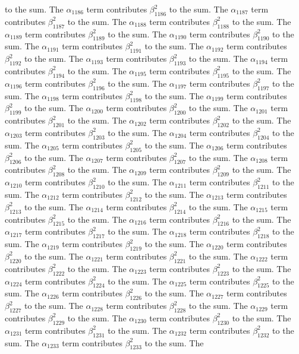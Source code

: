 \begin{lemma}
to the sum. The $\alpha_{1186}$ term contributes $\beta_{1186}^{2}$ to the sum. The $\alpha_{1187}$ term contributes $\beta_{1187}^{2}$ to the sum. The $\alpha_{1188}$ term contributes $\beta_{1188}^{2}$ to the sum. The $\alpha_{1189}$ term contributes $\beta_{1189}^{2}$ to the sum. The $\alpha_{1190}$ term contributes $\beta_{1190}^{2}$ to the sum. The $\alpha_{1191}$ term contributes $\beta_{1191}^{2}$ to the sum. The $\alpha_{1192}$ term contributes $\beta_{1192}^{2}$ to the sum. The $\alpha_{1193}$ term contributes $\beta_{1193}^{2}$ to the sum. The $\alpha_{1194}$ term contributes $\beta_{1194}^{2}$ to the sum. The $\alpha_{1195}$ term contributes $\beta_{1195}^{2}$ to the sum. The $\alpha_{1196}$ term contributes $\beta_{1196}^{2}$ to the sum. The $\alpha_{1197}$ term contributes $\beta_{1197}^{2}$ to the sum. The $\alpha_{1198}$ term contributes $\beta_{1198}^{2}$ to the sum. The $\alpha_{1199}$ term contributes $\beta_{1199}^{2}$ to the sum. The $\alpha_{1200}$ term contributes $\beta_{1200}^{2}$ to the sum. The $\alpha_{1201}$ term contributes $\beta_{1201}^{2}$ to the sum. The $\alpha_{1202}$ term contributes $\beta_{1202}^{2}$ to the sum. The $\alpha_{1203}$ term contributes $\beta_{1203}^{2}$ to the sum. The $\alpha_{1204}$ term contributes $\beta_{1204}^{2}$ to the sum. The $\alpha_{1205}$ term contributes $\beta_{1205}^{2}$ to the sum. The $\alpha_{1206}$ term contributes $\beta_{1206}^{2}$ to the sum. The $\alpha_{1207}$ term contributes $\beta_{1207}^{2}$ to the sum. The $\alpha_{1208}$ term contributes $\beta_{1208}^{2}$ to the sum. The $\alpha_{1209}$ term contributes $\beta_{1209}^{2}$ to the sum. The $\alpha_{1210}$ term contributes $\beta_{1210}^{2}$ to the sum. The $\alpha_{1211}$ term contributes $\beta_{1211}^{2}$ to the sum. The $\alpha_{1212}$ term contributes $\beta_{1212}^{2}$ to the sum. The $\alpha_{1213}$ term contributes $\beta_{1213}^{2}$ to the sum. The $\alpha_{1214}$ term contributes $\beta_{1214}^{2}$ to the sum. The $\alpha_{1215}$ term contributes $\beta_{1215}^{2}$ to the sum. The $\alpha_{1216}$ term contributes $\beta_{1216}^{2}$ to the sum. The $\alpha_{1217}$ term contributes $\beta_{1217}^{2}$ to the sum. The $\alpha_{1218}$ term contributes $\beta_{1218}^{2}$ to the sum. The $\alpha_{1219}$ term contributes $\beta_{1219}^{2}$ to the sum. The $\alpha_{1220}$ term contributes $\beta_{1220}^{2}$ to the sum. The $\alpha_{1221}$ term contributes $\beta_{1221}^{2}$ to the sum. The $\alpha_{1222}$ term contributes $\beta_{1222}^{2}$ to the sum. The $\alpha_{1223}$ term contributes $\beta_{1223}^{2}$ to the sum. The $\alpha_{1224}$ term contributes $\beta_{1224}^{2}$ to the sum. The $\alpha_{1225}$ term contributes $\beta_{1225}^{2}$ to the sum. The $\alpha_{1226}$ term contributes $\beta_{1226}^{2}$ to the sum. The $\alpha_{1227}$ term contributes $\beta_{1227}^{2}$ to the sum. The $\alpha_{1228}$ term contributes $\beta_{1228}^{2}$ to the sum. The $\alpha_{1229}$ term contributes $\beta_{1229}^{2}$ to the sum. The $\alpha_{1230}$ term contributes $\beta_{1230}^{2}$ to the sum. The $\alpha_{1231}$ term contributes $\beta_{1231}^{2}$ to the sum. The $\alpha_{1232}$ term contributes $\beta_{1232}^{2}$ to the sum. The $\alpha_{1233}$ term contributes $\beta_{1233}^{2}$ to the sum. The 
\end{lemma}
